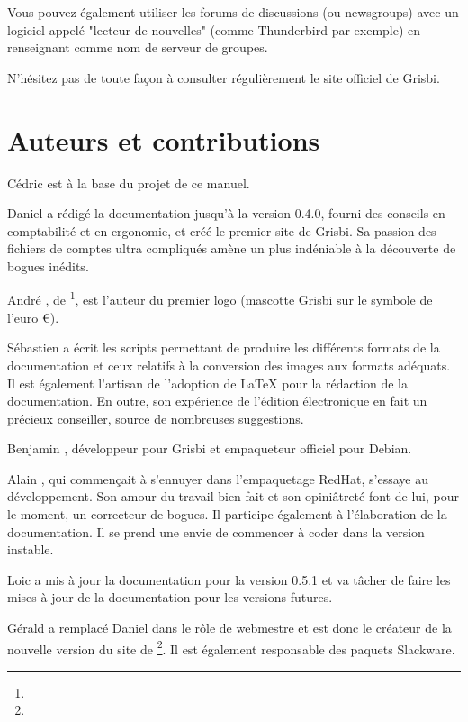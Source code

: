 Vous pouvez également utiliser les forums de discussions (ou newsgroups) avec un logiciel appelé "lecteur de nouvelles" (comme Thunderbird par exemple) en renseignant  comme nom de serveur de groupes.

N'hésitez pas de toute façon à consulter régulièrement le site officiel de Grisbi.



\section{Auteurs et contributions\label{introduction-authors}}		%


{Cédric } est à la base du projet de ce manuel.

{Daniel } a rédigé la documentation jusqu'à la version 0.4.0, fourni des conseils en comptabilité
et en ergonomie, et créé le premier site de Grisbi. Sa passion des fichiers de
comptes ultra compliqués amène un plus indéniable à la découverte de bogues inédits.

{André }, de
\footnote{\urlLinuxGraphic{}}, est l'auteur du premier logo (mascotte Grisbi sur le symbole de l'euro €).

{Sébastien } a écrit les scripts permettant de produire les différents formats de la documentation et ceux relatifs à la conversion des images aux formats adéquats. Il est également l'artisan de l'adoption de \gls{LaTeX} pour la rédaction de la documentation. En outre, son expérience de l'édition électronique en fait un précieux conseiller, source de nombreuses suggestions.

{Benjamin }, développeur pour Grisbi et empaqueteur officiel pour \gls{Debian}.

{Alain }, qui commençait à s'ennuyer dans l'empaquetage \gls{RedHat}, s'essaye au développement. Son amour du travail bien fait et son opiniâtreté font de lui, pour le moment, un correcteur de bogues. Il participe également à l'élaboration de la documentation. Il se prend une envie de commencer à coder dans la version instable.

{Loic } a mis à jour la documentation pour la version 0.5.1 et va tâcher de faire les mises à jour de la documentation pour les versions futures.

{Gérald } a remplacé
{Daniel } dans le rôle de webmestre et est donc le créateur de la nouvelle version du site de \footnote{\urlGrisbi{}}. Il est
également responsable des paquets \gls{Slackware}.

